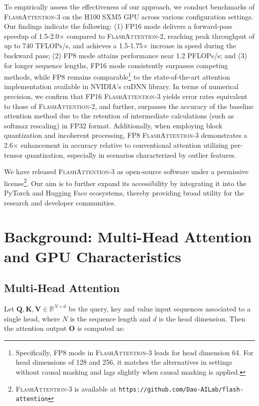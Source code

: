 \begin{enumerate}
To empirically assess the effectiveness of our approach, we conduct benchmarks of \textsc{FlashAttention-3} on the H100 SXM5 GPU across various configuration settings. Our findings indicate the following: (1) FP16 mode delivers a forward-pass speedup of 1.5-2.0$\times$ compared to \textsc{FlashAttention-2}, reaching peak throughput of up to 740 TFLOPs/s, and achieves a 1.5-1.75$\times$ increase in speed during the backward pass; (2) FP8 mode attains performance near 1.2 PFLOPs/s; and (3) for longer sequence lengths, FP16 mode consistently surpasses competing methods, while FP8 remains comparable\footnote{Specifically, FP8 mode in \textsc{FlashAttention-3} leads for head dimension 64. For head dimensions of 128 and 256, it matches the alternatives in settings without causal masking and lags slightly when causal masking is applied.} to the state-of-the-art attention implementation available in NVIDIA’s cuDNN library. In terms of numerical precision, we confirm that FP16 \textsc{FlashAttention-3} yields error rates equivalent to those of \textsc{FlashAttention-2}, and further, surpasses the accuracy of the baseline attention method due to the retention of intermediate calculations (such as softmax rescaling) in FP32 format. Additionally, when employing block quantization and incoherent processing, FP8 \textsc{FlashAttention-3} demonstrates a 2.6$\times$ enhancement in accuracy relative to conventional attention utilizing per-tensor quantization, especially in scenarios characterized by outlier features.

We have released \textsc{FlashAttention-3} as open-source software under a permissive license\footnote{\textsc{FlashAttention-3}
  is available at \texttt{https://github.com/Dao-AILab/flash-attention}}. Our aim is to further expand its accessibility by integrating it into the PyTorch and Hugging Face ecosystems, thereby providing broad utility for the research and developer communities.

\section{Background: Multi-Head Attention and GPU Characteristics}
\label{sec:background}

\subsection{Multi-Head Attention}
\label{subsec:multi_head_attn}

Let $\mathbf{Q}, \mathbf{K}, \mathbf{V} \in \mathbb{R}^{N \times d}$ be the query, key and value input sequences associated to a single head, where $N$ is the sequence length and $d$ is the head dimension. Then the attention output $\mathbf{O}$ is computed as:


\end{enumerate}
